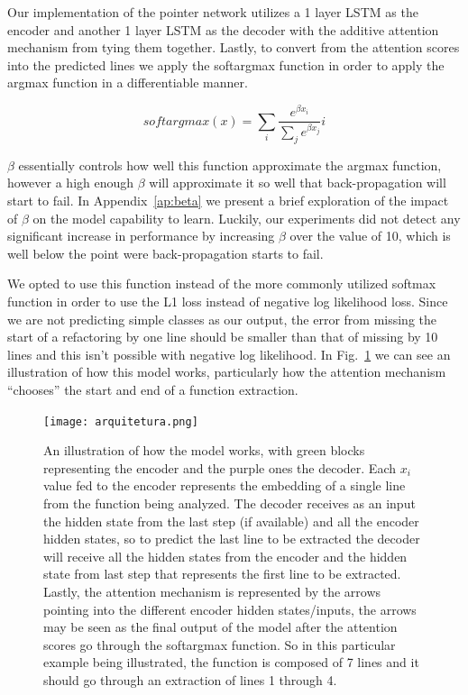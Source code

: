 Our implementation of the pointer network utilizes a 1 layer LSTM as the encoder and another 1 layer LSTM as the decoder with the additive attention mechanism from \citet{bahdanau} tying them together. Lastly, to convert from the attention scores into the predicted lines we apply the softargmax function in order to apply the argmax function in a differentiable manner.



$$\textit{softargmax}(x)=\sum_i \frac{e^{\beta x_i}}{\sum_j e^{\beta x_j}}i$$

$\beta$ essentially controls how well this function approximate the argmax function, however a high enough $\beta$ will approximate it so well that back-propagation will start to fail. In Appendix~\ref{ap:beta} we present a brief exploration of the impact of $\beta$ on the model capability to learn. Luckily, our experiments did not detect any significant increase in performance by increasing $\beta$ over the value of 10, which is well below the point were back-propagation starts to fail.

We opted to use this function instead of the more commonly utilized softmax function in order to use the L1 loss instead of negative log likelihood loss. Since we are not predicting simple classes as our output, the error from missing the start of a refactoring by one line should be smaller than that of missing by 10 lines and this isn't possible with negative log likelihood. 
In Fig.~\ref{arquitetura} we can see an illustration of how this model works, particularly how the attention mechanism ``chooses'' the start and end of a function extraction. 





\begin{figure}[!ht]
\centerline{\texttt{[image: arquitetura.png]}   }
\caption{An illustration of how the model works, with green blocks representing the encoder and the purple ones the decoder. Each $x_i$ value fed to the encoder represents the embedding of a single line from the function being analyzed. The decoder receives as an input the hidden state from the last step (if available) and all the encoder hidden states, so to predict the last line to be extracted the decoder will receive all the hidden states from the encoder and the hidden state from last step that represents the first line to be extracted. Lastly, the attention mechanism is represented by the arrows pointing into the different encoder hidden states/inputs, the arrows may be seen as the final output of the model after the attention scores go through the softargmax function. So in this particular example being illustrated, the function is composed of 7 lines and it should go through an extraction of lines 1 through 4.}
\label{arquitetura}
\end{figure}




